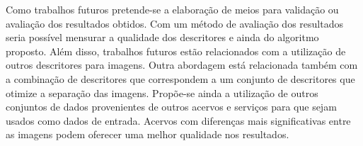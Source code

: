 Como trabalhos futuros pretende-se a elaboração de meios para validação ou avaliação dos resultados obtidos. Com um método de avaliação dos resultados seria possível mensurar a qualidade dos descritores e ainda do algoritmo proposto. Além disso, trabalhos futuros estão relacionados com a utilização de outros descritores para imagens. Outra abordagem está relacionada também com a combinação de descritores que correspondem a um conjunto de descritores que otimize a separação das imagens.
Propõe-se ainda a utilização de outros conjuntos de dados provenientes de outros acervos e serviços para que sejam usados como dados de entrada. Acervos com diferenças mais significativas entre as imagens podem oferecer uma melhor qualidade nos resultados. 